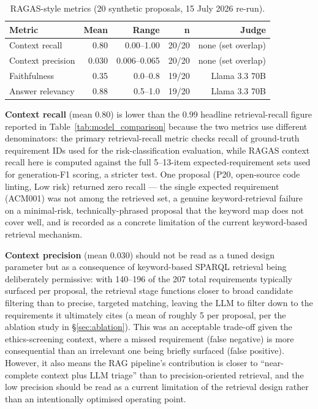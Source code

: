 \begin{table}[htbp]
\centering
\caption{RAGAS-style metrics (20 synthetic proposals, 15 July 2026 re-run).}
\label{tab:ragas}
\begin{tabular}{lrrrr}
\toprule
\textbf{Metric} & \textbf{Mean} & \textbf{Range} & \textbf{n} & \textbf{Judge} \\
\midrule
Context recall & 0.80 & 0.00--1.00 & 20/20 & none (set overlap) \\
Context precision & 0.030 & 0.006--0.065 & 20/20 & none (set overlap) \\
Faithfulness & 0.35 & 0.0--0.8 & 19/20 & Llama 3.3 70B \\
Answer relevancy & 0.88 & 0.5--1.0 & 19/20 & Llama 3.3 70B \\
\bottomrule
\end{tabular}
\end{table}

\textbf{Context recall} (mean 0.80) is lower than the 0.99 headline retrieval-recall figure reported in Table~\ref{tab:model_comparison} because the two metrics use different denominators: the primary retrieval-recall metric checks recall of ground-truth requirement IDs used for the risk-classification evaluation, while RAGAS context recall here is computed against the full 5--13-item expected-requirement sets used for generation-F1 scoring, a stricter test. One proposal (P20, open-source code linting, Low risk) returned zero recall — the single expected requirement (ACM001) was not among the retrieved set, a genuine keyword-retrieval failure on a minimal-risk, technically-phrased proposal that the keyword map does not cover well, and is recorded as a concrete limitation of the current keyword-based retrieval mechanism.

\textbf{Context precision} (mean 0.030) should not be read as a tuned design parameter but as a consequence of keyword-based SPARQL retrieval being deliberately permissive: with 140--196 of the 207 total requirements typically surfaced per proposal, the retrieval stage functions closer to broad candidate filtering than to precise, targeted matching, leaving the LLM to filter down to the requirements it ultimately cites (a mean of roughly 5 per proposal, per the ablation study in \S\ref{sec:ablation}). This was an acceptable trade-off given the ethics-screening context, where a missed requirement (false negative) is more consequential than an irrelevant one being briefly surfaced (false positive). However, it also means the RAG pipeline's contribution is closer to ``near-complete context plus LLM triage'' than to precision-oriented retrieval, and the low precision should be read as a current limitation of the retrieval design rather than an intentionally optimised operating point.

